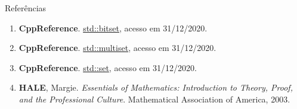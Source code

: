 \begin{frame}[fragile]{Referências}

    \begin{enumerate}
        \item \textbf{CppReference}. \href{https://en.cppreference.com/w/cpp/utility/bitset}{std::bitset}, acesso em 31/12/2020.

        \item \textbf{CppReference}. \href{https://en.cppreference.com/w/cpp/utility/multiset}{std::multiset}, acesso em 31/12/2020.

        \item \textbf{CppReference}. \href{https://en.cppreference.com/w/cpp/utility/set}{std::set}, acesso em 31/12/2020.

        \item \textbf{HALE}, Margie. \textit{Essentials of Mathematics: Introduction to Theory, Proof, and the Professional Culture}. Mathematical Association of America, 2003.
    \end{enumerate}

\end{frame}
